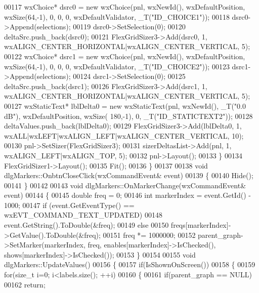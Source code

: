 \begin{DoxyCode}
{{{{00117         wxChoice* dsrc0 = \textcolor{keyword}{new} wxChoice(pnl, wxNewId(), wxDefaultPosition, wxSize(64,-1), 0, 0, 0, 
      wxDefaultValidator, _T(\textcolor{stringliteral}{"ID\_CHOICE1"}));
00118         dsrc0->Append(selections);
00119         dsrc0->SetSelection(0);
00120         deltaSrc.push\_back(dsrc0);
00121         FlexGridSizer3->Add(dsrc0, 1, wxALIGN\_CENTER\_HORIZONTAL|wxALIGN\_CENTER\_VERTICAL, 5);
00122         wxChoice* dsrc1 = \textcolor{keyword}{new} wxChoice(pnl, wxNewId(), wxDefaultPosition, wxSize(64,-1), 0, 0, 0, 
      wxDefaultValidator, _T(\textcolor{stringliteral}{"ID\_CHOICE2"}));
00123         dsrc1->Append(selections);
00124         dsrc1->SetSelection(0);
00125         deltaSrc.push\_back(dsrc1);
00126         FlexGridSizer3->Add(dsrc1, 1, wxALIGN\_CENTER\_HORIZONTAL|wxALIGN\_CENTER\_VERTICAL, 5);
00127         wxStaticText* lblDelta0 = \textcolor{keyword}{new} wxStaticText(pnl, wxNewId(), _T(\textcolor{stringliteral}{"0.0 dB"}), wxDefaultPosition, wxSize(
      180,-1), 0, _T(\textcolor{stringliteral}{"ID\_STATICTEXT2"}));
00128         deltaValues.push\_back(lblDelta0);
00129         FlexGridSizer3->Add(lblDelta0, 1, wxALL|wxLEFT|wxALIGN\_LEFT|wxALIGN\_CENTER\_VERTICAL, 10);
00130         pnl->SetSizer(FlexGridSizer3);
00131         sizerDeltasList->Add(pnl, 1, wxALIGN\_LEFT|wxALIGN\_TOP, 5);
00132         pnl->Layout();
00133     \}
00134     FlexGridSizer1->Layout();
00135     Fit();
00136 \}
00137 
00138 \textcolor{keywordtype}{void} dlgMarkers::OnbtnCloseClick(wxCommandEvent& event)
00139 \{
00140     Hide();
00141 \}
00142 
00143 \textcolor{keywordtype}{void} dlgMarkers::OnMarkerChange(wxCommandEvent& event)
00144 \{
00145     \textcolor{keywordtype}{double} freq = 0;
00146     \textcolor{keywordtype}{int} markerIndex = \textcolor{keyword}{event}.GetId() - 1000;
00147     \textcolor{keywordflow}{if} (event.GetEventType() == wxEVT\_COMMAND\_TEXT\_UPDATED)
00148         event.GetString().ToDouble(&freq);
00149     \textcolor{keywordflow}{else} 
00150         freqs[markerIndex]->GetValue().ToDouble(&freq);
00151     freq *= 1000000;
00152     parent_graph->SetMarker(markerIndex, freq, enables[markerIndex]->IsChecked(), 
      shows[markerIndex]->IsChecked());
00153 \}
00154 
00155 \textcolor{keywordtype}{void} dlgMarkers::UpdateValues()
00156 \{
00157     \textcolor{keywordflow}{if}(IsShownOnScreen())
00158     \{
00159         \textcolor{keywordflow}{for}(\textcolor{keywordtype}{size\_t} i=0; i<labels.size(); ++i)
00160         \{
00161             \textcolor{keywordflow}{if}(parent_graph == NULL)
00162                 \textcolor{keywordflow}{return};
}}}}
\end{DoxyCode}
